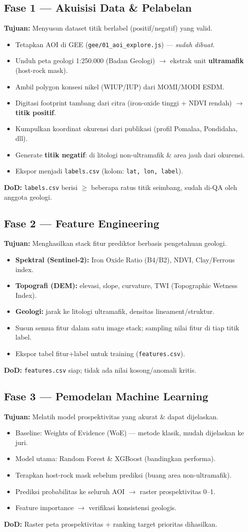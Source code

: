 \documentclass[11pt,a4paper]{article}
\newcommand{\todo}{\item[$\square$]}
\begin{document}
\subsection{Fase 1 --- Akuisisi Data \& Pelabelan}
\textbf{Tujuan:} Menyusun dataset titik berlabel (positif/negatif) yang valid.
\begin{itemize}[leftmargin=1.5em]
  \todo Tetapkan AOI di GEE (\texttt{gee/01\_aoi\_explore.js}) --- \emph{sudah dibuat}.
  \todo Unduh peta geologi 1:250.000 (Badan Geologi) $\rightarrow$ ekstrak unit \textbf{ultramafik} (host-rock mask).
  \todo Ambil polygon konsesi nikel (WIUP/IUP) dari MOMI/MODI ESDM.
  \todo Digitasi footprint tambang dari citra (iron-oxide tinggi + NDVI rendah) $\rightarrow$ \textbf{titik positif}.
  \todo Kumpulkan koordinat okurensi dari publikasi (profil Pomalaa, Pondidaha, dll).
  \todo Generate \textbf{titik negatif}: di litologi non-ultramafik \& area jauh dari okurensi.
  \todo Ekspor menjadi \texttt{labels.csv} (kolom: \texttt{lat, lon, label}).
\end{itemize}
\textbf{DoD:} \texttt{labels.csv} berisi $\geq$ beberapa ratus titik seimbang,
sudah di-QA oleh anggota geologi.

\subsection{Fase 2 --- Feature Engineering}
\textbf{Tujuan:} Menghasilkan stack fitur prediktor berbasis pengetahuan geologi.
\begin{itemize}[leftmargin=1.5em]
  \todo \textbf{Spektral (Sentinel-2):} Iron Oxide Ratio (B4/B2), NDVI, Clay/Ferrous index.
  \todo \textbf{Topografi (DEM):} elevasi, slope, curvature, TWI (Topographic Wetness Index).
  \todo \textbf{Geologi:} jarak ke litologi ultramafik, densitas lineament/struktur.
  \todo Susun semua fitur dalam satu image stack; sampling nilai fitur di tiap titik label.
  \todo Ekspor tabel fitur+label untuk training (\texttt{features.csv}).
\end{itemize}
\textbf{DoD:} \texttt{features.csv} siap; tidak ada nilai kosong/anomali kritis.

\subsection{Fase 3 --- Pemodelan Machine Learning}
\textbf{Tujuan:} Melatih model prospektivitas yang akurat \& dapat dijelaskan.
\begin{itemize}[leftmargin=1.5em]
  \todo Baseline: Weights of Evidence (WoE) --- metode klasik, mudah dijelaskan ke juri.
  \todo Model utama: Random Forest \& XGBoost (bandingkan performa).
  \todo Terapkan host-rock mask sebelum prediksi (buang area non-ultramafik).
  \todo Prediksi probabilitas ke seluruh AOI $\rightarrow$ raster prospektivitas 0--1.
  \todo Feature importance $\rightarrow$ verifikasi konsistensi geologis.
\end{itemize}
\textbf{DoD:} Raster peta prospektivitas + ranking target prioritas dihasilkan.
\end{document}
